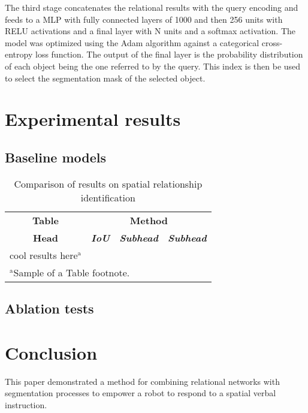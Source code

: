 \documentclass[conference]{IEEEtran}
\begin{document}
The third stage concatenates the relational results with the query encoding and feeds to a MLP with fully connected layers of 1000 and then 256 units with RELU activations and a final layer with N units and a softmax activation.  The model was optimized using the Adam algorithm against a categorical cross-entropy loss function.  The output of the final layer is the probability distribution of each object being the one referred to by the query.  This index is then be used to select the segmentation mask of the selected object. 
 

    \section{Experimental results}
    
    \subsection{Baseline models}
    \begin{table}[htbp]
        \caption{Comparison of results on spatial relationship identification}
        \begin{center}
        \begin{tabular}{|c|c|c|c|}
        \hline
        \textbf{Table}&\multicolumn{3}{|c|}{\textbf{Method}} \\
        \cline{2-4} 
        \textbf{Head} & \textbf{\textit{IoU}}& \textbf{\textit{Subhead}}& \textbf{\textit{Subhead}} \\
        \hline
        cool results here$^{\mathrm{a}}$& &  \\
        \hline
        \multicolumn{4}{l}{$^{\mathrm{a}}$Sample of a Table footnote.}
        \end{tabular}
        \label{tab1}
        \end{center}
        \end{table}

    \subsection{Ablation tests}
    \section{Conclusion}

This paper demonstrated a method for combining relational networks with segmentation processes to empower a robot to respond to a spatial verbal instruction.  
\end{document}
